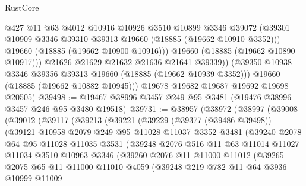 \begin{lexlean}{RustCore}
\begin{coremodule}
                @427
                @11
                @63
                @4012
                @10916
                @10926
                @3510
                @10899
                @3346
                @39072
                (@39301 @10909 @3346 @39310 @39313 @19660 (@18885 (@19662 @10910 @3352)))
                @19660
                (@18885 (@19662 @10900 @10916)))
              @19660
              (@18885 (@19662 @10890 @10917)))
            @21626
            @21629
            @21632
            @21636
            @21641
            @39339))
        (@39350 @10938 @3346 @39356 @39313 @19660 (@18885 (@19662 @10939 @3352)))
        @19660
        (@18885 (@19662 @10882 @10945)))
      @19678
      @19682
      @19687
      @19692
      @19698
      @20505)
@39498 := @19467 @38996 @3457 @249 @95 @3481 (@19476 @38996 @3457 @246 @95 @3480 @19518)
@39731 := @38957
    (@38972
      (@38997
        (@39008
          (@39012
            (@39117
              (@39213
                (@39221
                  (@39229
                    (@39377 (@39486 @39498))
                    (@39121
                      @10958
                      @2079
                      @249
                      @95
                      @11028
                      @11037
                      @3352
                      @3481
                      (@39240
                        @2078
                        @64
                        @95
                        @11028
                        @11035
                        @3531
                        (@39248
                          @2076
                          @516
                          @11
                          @63
                          @11014
                          @11027
                          @11034
                          @3510
                          @10963
                          @3346
                          (@39260
                            @2076
                            @11
                            @11000
                            @11012
                            (@39265
                              @2075
                              @65
                              @11
                              @11000
                              @11010
                              @4059
                              (@39248
                                @219
                                @782
                                @11
                                @64
                                @3936
                                @10999
                                @11009

\end{coremodule}
\end{lexlean}
